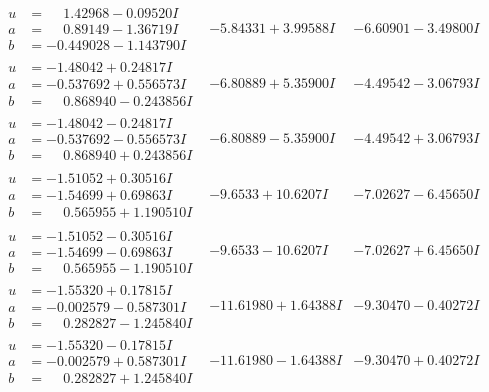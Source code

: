 \documentclass[1p]{elsarticle_modified}
\theoremstyle{definition}
\begin{document}
$$\begin{array}{c|c|c}
\begin{aligned}
u &= \phantom{-}1.42968 - 0.09520 I \\
a &= \phantom{-}0.89149 - 1.36719 I \\
b &= -0.449028 - 1.143790 I\end{aligned}
 & -5.84331 + 3.99588 I & -6.60901 - 3.49800 I \\ \hline\begin{aligned}
u &= -1.48042 + 0.24817 I \\
a &= -0.537692 + 0.556573 I \\
b &= \phantom{-}0.868940 - 0.243856 I\end{aligned}
 & -6.80889 + 5.35900 I & -4.49542 - 3.06793 I \\ \hline\begin{aligned}
u &= -1.48042 - 0.24817 I \\
a &= -0.537692 - 0.556573 I \\
b &= \phantom{-}0.868940 + 0.243856 I\end{aligned}
 & -6.80889 - 5.35900 I & -4.49542 + 3.06793 I \\ \hline\begin{aligned}
u &= -1.51052 + 0.30516 I \\
a &= -1.54699 + 0.69863 I \\
b &= \phantom{-}0.565955 + 1.190510 I\end{aligned}
 & -9.6533 + 10.6207 I & -7.02627 - 6.45650 I \\ \hline\begin{aligned}
u &= -1.51052 - 0.30516 I \\
a &= -1.54699 - 0.69863 I \\
b &= \phantom{-}0.565955 - 1.190510 I\end{aligned}
 & -9.6533 - 10.6207 I & -7.02627 + 6.45650 I \\ \hline\begin{aligned}
u &= -1.55320 + 0.17815 I \\
a &= -0.002579 - 0.587301 I \\
b &= \phantom{-}0.282827 - 1.245840 I\end{aligned}
 & -11.61980 + 1.64388 I & -9.30470 - 0.40272 I \\ \hline\begin{aligned}
u &= -1.55320 - 0.17815 I \\
a &= -0.002579 + 0.587301 I \\
b &= \phantom{-}0.282827 + 1.245840 I\end{aligned}
 & -11.61980 - 1.64388 I & -9.30470 + 0.40272 I \\ \hline\begin{aligned}

\end{aligned}
\end{array}$$
\end{document}
